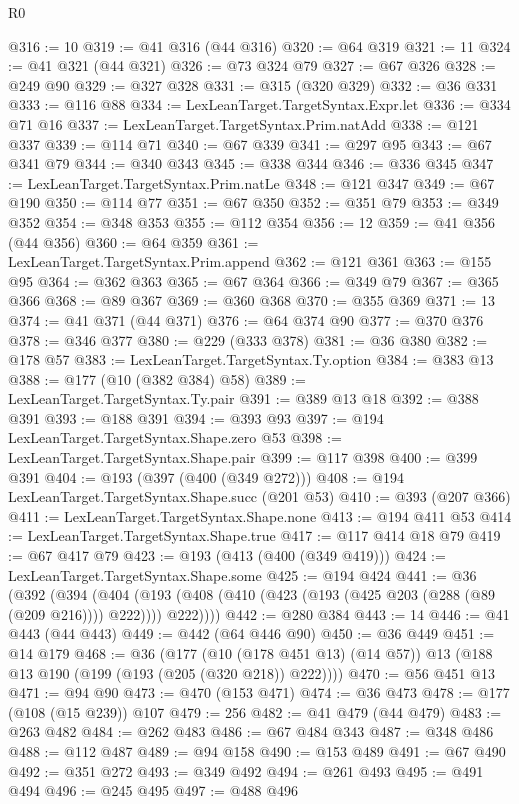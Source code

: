 \begin{lexlean}{R0}
\begin{coremodule}
{{{{{{{{{{{{{{{{{{{{{{{{{{{{{{{{@316 := 10
@319 := @41 @316 (@44 @316)
@320 := @64 @319
@321 := 11
@324 := @41 @321 (@44 @321)
@326 := @73 @324 @79
@327 := @67 @326
@328 := @249 @90
@329 := @327 @328
@331 := @315 (@320 @329)
@332 := @36 @331
@333 := @116 @88
@334 := LexLeanTarget.TargetSyntax.Expr.let
@336 := @334 @71 @16
@337 := LexLeanTarget.TargetSyntax.Prim.natAdd
@338 := @121 @337
@339 := @114 @71
@340 := @67 @339
@341 := @297 @95
@343 := @67 @341 @79
@344 := @340 @343
@345 := @338 @344
@346 := @336 @345
@347 := LexLeanTarget.TargetSyntax.Prim.natLe
@348 := @121 @347
@349 := @67 @190
@350 := @114 @77
@351 := @67 @350
@352 := @351 @79
@353 := @349 @352
@354 := @348 @353
@355 := @112 @354
@356 := 12
@359 := @41 @356 (@44 @356)
@360 := @64 @359
@361 := LexLeanTarget.TargetSyntax.Prim.append
@362 := @121 @361
@363 := @155 @95
@364 := @362 @363
@365 := @67 @364
@366 := @349 @79
@367 := @365 @366
@368 := @89 @367
@369 := @360 @368
@370 := @355 @369
@371 := 13
@374 := @41 @371 (@44 @371)
@376 := @64 @374 @90
@377 := @370 @376
@378 := @346 @377
@380 := @229 (@333 @378)
@381 := @36 @380
@382 := @178 @57
@383 := LexLeanTarget.TargetSyntax.Ty.option
@384 := @383 @13
@388 := @177 (@10 (@382 @384) @58)
@389 := LexLeanTarget.TargetSyntax.Ty.pair
@391 := @389 @13 @18
@392 := @388 @391
@393 := @188 @391
@394 := @393 @93
@397 := @194 LexLeanTarget.TargetSyntax.Shape.zero @53
@398 := LexLeanTarget.TargetSyntax.Shape.pair
@399 := @117 @398
@400 := @399 @391
@404 := @193 (@397 (@400 (@349 @272)))
@408 := @194 LexLeanTarget.TargetSyntax.Shape.succ (@201 @53)
@410 := @393 (@207 @366)
@411 := LexLeanTarget.TargetSyntax.Shape.none
@413 := @194 @411 @53
@414 := LexLeanTarget.TargetSyntax.Shape.true
@417 := @117 @414 @18 @79
@419 := @67 @417 @79
@423 := @193 (@413 (@400 (@349 @419)))
@424 := LexLeanTarget.TargetSyntax.Shape.some
@425 := @194 @424
@441 := @36
    (@392
      (@394
        (@404 (@193 (@408 (@410 (@423 (@193 (@425 @203 (@288 (@89 (@209 @216)))) @222)))) @222))))
@442 := @280 @384
@443 := 14
@446 := @41 @443 (@44 @443)
@449 := @442 (@64 @446 @90)
@450 := @36 @449
@451 := @14 @179
@468 := @36
    (@177 (@10 (@178 @451 @13) (@14 @57)) @13 (@188 @13 @190 (@199 (@193 (@205 (@320 @218)) @222))))
@470 := @56 @451 @13
@471 := @94 @90
@473 := @470 (@153 @471)
@474 := @36 @473
@478 := @177 (@108 (@15 @239)) @107
@479 := 256
@482 := @41 @479 (@44 @479)
@483 := @263 @482
@484 := @262 @483
@486 := @67 @484 @343
@487 := @348 @486
@488 := @112 @487
@489 := @94 @158
@490 := @153 @489
@491 := @67 @490
@492 := @351 @272
@493 := @349 @492
@494 := @261 @493
@495 := @491 @494
@496 := @245 @495
@497 := @488 @496
}}}}}}}}}}}}}}}}}}}}}}}}}}}}}}}}
\end{coremodule}
\end{lexlean}
